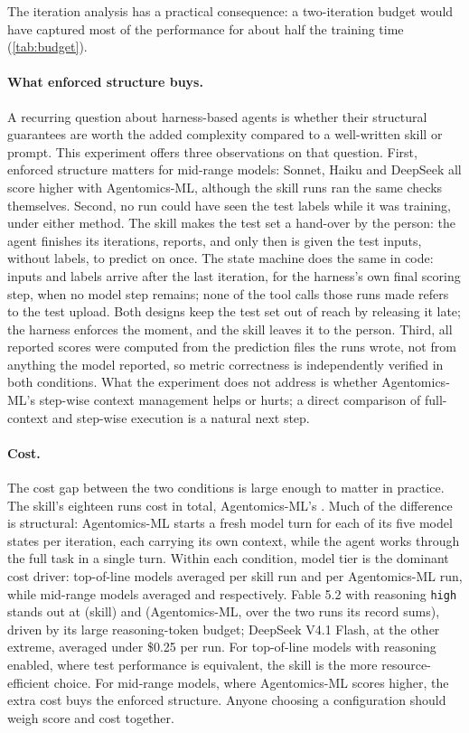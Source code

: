 The iteration analysis has a practical consequence: a two-iteration budget would have captured most of the
performance for about half the training time (\cref{tab:budget}).

\paragraph{What enforced structure buys.} A recurring question about harness-based agents is whether their structural
guarantees are worth the added complexity compared to a well-written skill or prompt. This experiment offers three observations
on that question. First, enforced structure matters for mid-range models: Sonnet, Haiku and DeepSeek all score
higher with Agentomics-ML, although the skill runs ran the same checks themselves. Second, no run could have seen the test labels while it was training, under either method. The skill makes the
test set a hand-over by the person: the agent finishes its iterations, reports, and only then is given the test
inputs, without labels, to predict on once. The state machine does the same in code: inputs and labels arrive after
the last iteration, for the harness's own final scoring step, when no model step remains; none of the tool calls those
runs made refers to the test upload. Both designs keep the test set out of reach by releasing it late;
the harness enforces the moment, and the skill leaves it to the person. Third, all reported scores were computed from the prediction files the runs wrote, not from anything the model
reported, so metric correctness is independently verified in both conditions. What the experiment does not address is whether
Agentomics-ML's step-wise context management helps or hurts; a direct comparison of full-context and step-wise
execution is a natural next step.

\paragraph{Cost.} The cost gap between the two conditions is large enough to matter in practice. The skill's eighteen
runs cost \SkillCost{} in total, Agentomics-ML's \SmCost{}. Much of the difference is structural: Agentomics-ML starts
a fresh model turn for each of its five model states per iteration, each carrying its own context, while the agent
works through the full task in a single turn. Within each condition, model tier is the dominant cost driver: top-of-line
models averaged \FlagSkillAvgCost{} per skill run and \FlagSmAvgCost{} per Agentomics-ML run, while mid-range models
averaged \SmallSkillAvgCost{} and \SmallSmAvgCost{} respectively. Fable 5.2 with reasoning \texttt{high} stands out at \FableSkillHighCost{} (skill) and \FableSmHighCost{}
(Agentomics-ML, over the two runs its record sums), driven by its large reasoning-token budget; DeepSeek V4.1 Flash, at the other extreme,
averaged under \$0.25 per run. For top-of-line models with reasoning enabled, where test performance is equivalent, the
skill is the more resource-efficient choice. For mid-range models, where Agentomics-ML scores higher, the extra cost
buys the enforced structure. Anyone choosing a configuration should weigh score and cost together.

